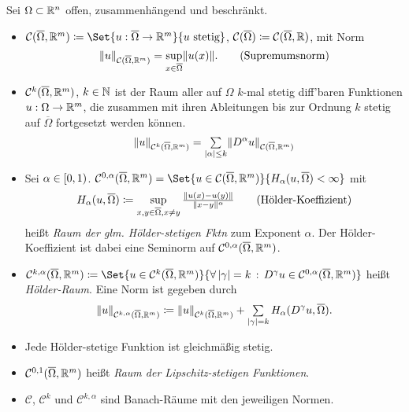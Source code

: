 \documentclass{cheat-sheet}
\newcommand{\Cont}{\mathcal{C}} %
\newcommand{\clos}[1]{\overline{#1}} %
\newcommand{\cOmega}{\clos{\Omega}} %
\begin{document}
\begin{defn}
  Sei $\Omega \subset \mathbb{R}^n$ offen, zusammenhängend und beschränkt.
  \begin{itemize}
    \item $\Cont(\cOmega, \R^m) \coloneqq \Set{u : \cOmega \to \R^m}{u \text{ stetig}}$, $\Cont(\cOmega) \coloneqq \Cont(\cOmega, \R)$, mit Norm
    \[
      \norm{u}_{\Cont(\cOmega, \R^m)} = \sup_{x \in \cOmega} \norm{u(x)}.
      \tag{Supremumsnorm}
    \]
    \item $\Cont^k(\cOmega, \R^m)$, $k \in \mathbb{N}$ ist der Raum aller auf $\Omega$ $k$-mal stetig diff'baren Funktionen $u : \Omega \to \mathbb{R}^m$, die zusammen mit ihren Ableitungen bis zur Ordnung $k$ stetig auf $\cOmega$ fortgesetzt werden können.
    \[ \norm{u}_{\Cont^k(\overline{\Omega}, \R^m)} = \sum_{\abs{\alpha} \leq k} \norm{D^\alpha u}_{\Cont(\overline{\Omega}, \R^m)} \]
    \item Sei $\alpha \in \left[ 0, 1 \right)$. $\Cont^{0,\alpha}(\cOmega, \R^m) = \Set{u \in \Cont(\cOmega, \R^m)}{H_\alpha(u, \cOmega) < \infty}$ mit
    \[
      H_\alpha(u, \cOmega) \coloneqq \sup_{x, y \in \cOmega, x \neq y} \tfrac{\norm{u(x)-u(y)}}{\norm{x-y}^\alpha}
      \tag{Hölder-Koeffizient}
    \]
    heißt \emph{Raum der glm. Hölder-stetigen Fktn} zum Exponent $\alpha$.
    Der Hölder-Koeffizient ist dabei eine Seminorm auf $\Cont^{0,\alpha}(\cOmega, \R^m)$.
    \item $\Cont^{k,\alpha}(\cOmega, \R^m) \coloneqq \Set{u \in \Cont^k(\cOmega, \R^m)}{\fa{\abs{\gamma} = k} D^\gamma u \in \Cont^{0, \alpha}(\cOmega, \R^m)}$ heißt \emph{Hölder-Raum}.
    Eine Norm ist gegeben durch
    \[ \norm{u}_{\Cont^{k,\alpha}(\cOmega, \R^m)} \coloneqq \norm{u}_{\Cont^k(\cOmega, \R^m)} + \sum_{\abs{\gamma} = k} H_\alpha(D^\gamma u, \cOmega). \]
  \end{itemize}
\end{defn}

\begin{bem}
  \begin{itemize}
    \item Jede Hölder-stetige Funktion ist gleichmäßig stetig.
    \item $\Cont^{0,1}(\cOmega, \R^m)$ heißt \emph{Raum der Lipschitz-stetigen Funktionen}.
    \item $\Cont$, $\Cont^k$ und $\Cont^{k,\alpha}$ sind Banach-Räume mit den jeweiligen Normen.
  \end{itemize}
\end{bem}

\iffalse
\begin{bsp}
  Betrachte $u(x) = \abs{x}^\beta$ auf $\ointerval{-1}{1} = \Omega$. Dann ist
  \[ \tfrac{\abs{u(x) - u(0)}}{\abs{x - 0}^\alpha} = \abs{X}^{\beta - \alpha} \]
  genau dann beschränkt, falls $\beta \geq \alpha$.
  In diesem Fall ist $u$ Hölder-stetig zum Exponent $\alpha$.
\end{bsp}
\fi
\end{document}
